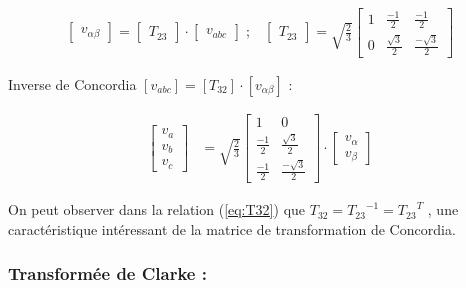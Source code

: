\begin{align}
    \begin{bmatrix}
        v_{\alpha \beta} 
    \end{bmatrix} = 
    \begin{bmatrix}
        T_{23}
    \end{bmatrix} \cdot 
    \begin{bmatrix}
        v_{abc}
    \end{bmatrix} \; ; \;\;\;
    \begin{bmatrix}
        T_{23}
    \end{bmatrix} = \sqrt{\frac{2}{3}}
    \begin{bmatrix}
        1 & \frac{-1}{2} & \frac{-1}{2} \\
        0 & \frac{\sqrt{3}}{2} & \frac{-\sqrt{3}}{2}
    \end{bmatrix}
    \label{eq:T23}
\end{align}

    
Inverse de Concordia $\left[ v_{abc} \right] = [T_{32}] \cdot \left[ v_{\alpha \beta}\right]$  :

\begin{align}
    \begin{bmatrix}
        v_a \\
        v_b \\
        v_c 
    \end{bmatrix} 
    &= 
    \sqrt{\frac{2}{3}}
    \begin{bmatrix}
        1 & 0 \\
        \frac{-1}{2} & \frac{\sqrt{3}}{2} \\
        \frac{-1}{2} & \frac{-\sqrt{3}}{2}
    \end{bmatrix} \cdot 
    \begin{bmatrix}
        v_{\alpha} \\
        v_{\beta} 
    \end{bmatrix}
    \label{eq:T32}
\end{align}

On peut observer dans la relation (\ref{eq:T32}) que $T_{32} = {T_{23}}^{-1} = {T_{23}}^{T}$ \cite{Chattopadhyay2008}, une caractéristique intéressant de la matrice de transformation de Concordia. 

\FloatBarrier
\subsubsection{Transformée de Clarke :}

